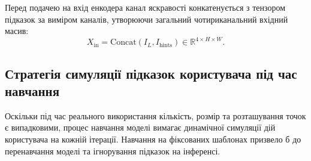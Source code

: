         Перед подачею на вхід енкодера канал яскравості конкатенується з тензором підказок за виміром каналів, утворюючи загальний чотириканальний вхідний масив:
        \begin{equation*}
            X_{\mathrm{in}} = \mathrm{Concat}(I_L, I_{\mathrm{hints}}) \in \mathbb{R}^{4 \times H \times W}.
        \end{equation*}

        \subsection{Стратегія симуляції підказок користувача під час навчання}
        \label{subsec:hints_generate_train}
            Оскільки під час реального використання кількість, розмір та розташування точок є випадковими,
            процес навчання моделі вимагає динамічної симуляції дій користувача на кожній ітерації.
            Навчання на фіксованих шаблонах призвело б до перенавчання моделі та ігнорування підказок на інференсі.


